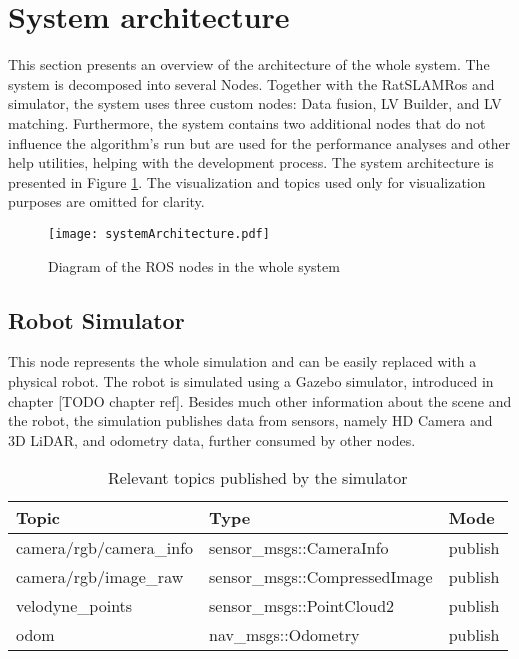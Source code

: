 \section{System architecture}\label{section:systemArchitecture}

This section presents an overview of the architecture of the whole system. The system is decomposed into several Nodes. Together with the  RatSLAMRos and simulator, the system uses three custom nodes: Data fusion, LV Builder, and LV matching. Furthermore, the system contains two additional nodes that do not influence the algorithm's run but are used for the performance analyses and other help utilities, helping with the development process. The system architecture is presented in Figure \ref{fig:systemArchitecture}. The visualization and topics used only for visualization purposes are omitted for clarity.

\begin{figure}[htpb]
    \centering
    \texttt{[image: systemArchitecture.pdf]}
    \caption{Diagram of the ROS nodes in the whole system} \label{fig:systemArchitecture}
\end{figure}

\subsection{Robot Simulator}

This node represents the whole simulation and can be easily replaced with a physical robot. The robot is simulated using a Gazebo simulator, introduced in chapter [TODO chapter ref]. Besides much other information about the scene and the robot, the simulation publishes data from sensors, namely HD Camera and 3D LiDAR, and odometry data, further consumed by other nodes.

\begin{table}[htpb]
    \caption{Relevant topics published by the simulator}\label{tab:robotSimulatorTopics}
    \centering
    \begin{tabular}{l l l}
        \toprule
        Topic                   & Type                          & Mode    \\
        \midrule
        camera/rgb/camera\_info & sensor\_msgs::CameraInfo      & publish \\
        camera/rgb/image\_raw   & sensor\_msgs::CompressedImage & publish \\
        velodyne\_points        & sensor\_msgs::PointCloud2     & publish \\
        odom                    & nav\_msgs::Odometry           & publish \\
        \bottomrule
    \end{tabular}
\end{table}

